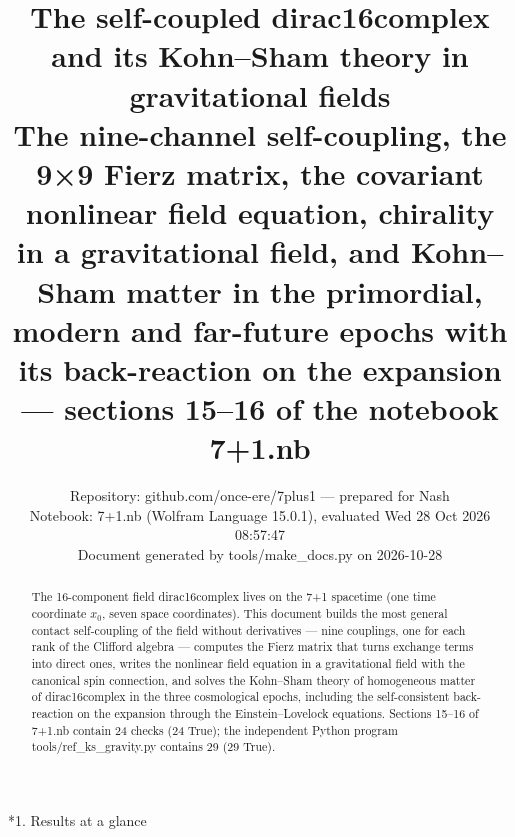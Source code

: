 \documentclass[10pt,a4paper]{article}
\makeatletter
\renewcommand\section{\@startsection{section}{1}{\z@}{-3.5ex \@plus -1ex \@minus -.2ex}{2.3ex \@plus.2ex}{\normalfont\Large\bfseries\raggedright}}
\makeatother
\begin{document}
\title{The self-coupled dirac16complex and its Kohn–Sham theory in gravitational fields\\[0.4em]\large The nine-channel self-coupling, the 9×9 Fierz matrix, the covariant nonlinear field equation, chirality in a gravitational field, and Kohn–Sham matter in the primordial, modern and far-future epochs with its back-reaction on the expansion — sections 15–16 of the notebook 7+1.nb}
\author{Repository: github.com/once-ere/7plus1 — prepared for Nash\\ Notebook: 7+1.nb (Wolfram Language 15.0.1), evaluated Wed 28 Oct 2026 08:57:47\\ Document generated by tools/make\_docs.py on 2026-10-28}
\date{}
\maketitle
\begin{abstract}
The 16-component field dirac16complex lives on the 7+1 spacetime (one time coordinate $x_0$, seven space coordinates). This document builds the most general contact self-coupling of the field without derivatives — nine couplings, one for each rank of the Clifford algebra — computes the Fierz matrix that turns exchange terms into direct ones, writes the nonlinear field equation in a gravitational field with the canonical spin connection, and solves the Kohn–Sham theory of homogeneous matter of dirac16complex in the three cosmological epochs, including the self-consistent back-reaction on the expansion through the Einstein–Lovelock equations. Sections 15–16 of 7+1.nb contain 24 checks (24 True); the independent Python program tools/ref\_ks\_gravity.py contains 29 (29 True).
\end{abstract}
\tableofcontents
{}\section*{1. Results at a glance}
\end{document}
